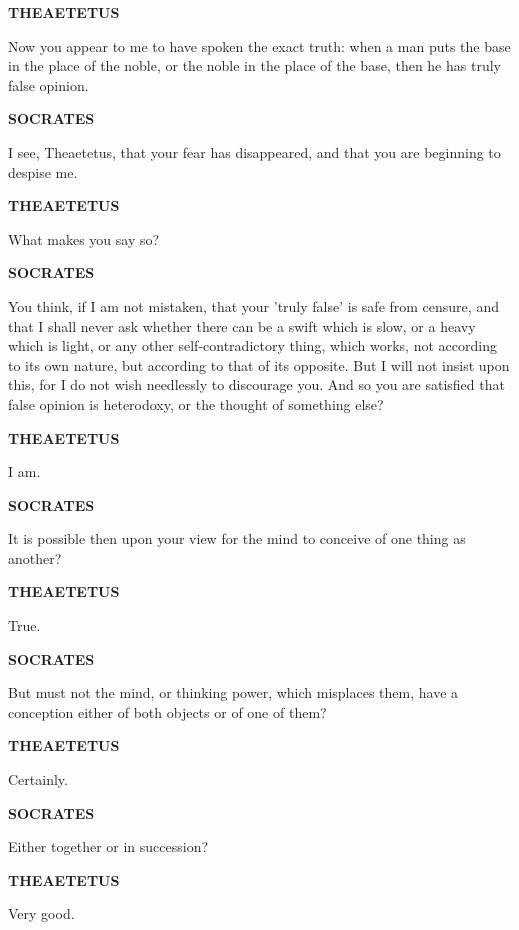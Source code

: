 \documentclass[11pt,letter]{article}
\begin{document}
\par \textbf{THEAETETUS}
\par   Now you appear to me to have spoken the exact truth:  when a man puts the base in the place of the noble, or the noble in the place of the base, then he has truly false opinion.

\par \textbf{SOCRATES}
\par   I see, Theaetetus, that your fear has disappeared, and that you are beginning to despise me.

\par \textbf{THEAETETUS}
\par   What makes you say so?

\par \textbf{SOCRATES}
\par   You think, if I am not mistaken, that your 'truly false' is safe from censure, and that I shall never ask whether there can be a swift which is slow, or a heavy which is light, or any other self-contradictory thing, which works, not according to its own nature, but according to that of its opposite. But I will not insist upon this, for I do not wish needlessly to discourage you. And so you are satisfied that false opinion is heterodoxy, or the thought of something else?

\par \textbf{THEAETETUS}
\par   I am.

\par \textbf{SOCRATES}
\par   It is possible then upon your view for the mind to conceive of one thing as another?

\par \textbf{THEAETETUS}
\par   True.

\par \textbf{SOCRATES}
\par   But must not the mind, or thinking power, which misplaces them, have a conception either of both objects or of one of them?

\par \textbf{THEAETETUS}
\par   Certainly.

\par \textbf{SOCRATES}
\par   Either together or in succession?

\par \textbf{THEAETETUS}
\par   Very good.
\end{document}
